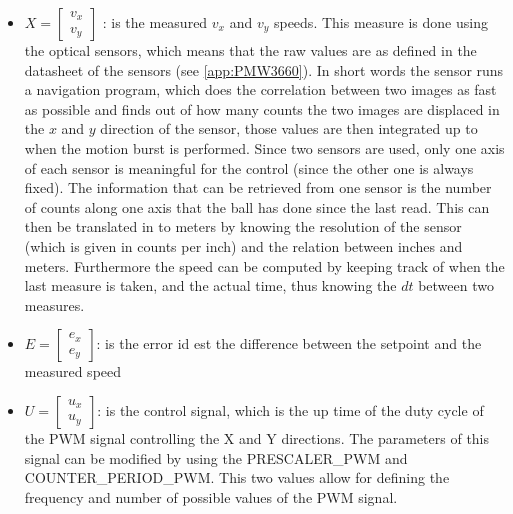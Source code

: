 \documentclass[12pt,a4paper]{article}
\begin{document}
\begin{itemize}
	\item 
	$X = \begin{bmatrix}
	v_x\\
	v_y
	\end{bmatrix}$
	: is the measured $v_x$ and $v_y$ speeds. This measure is done using the optical sensors, which means that the raw values are as defined in the datasheet of the sensors (see \ref{app:PMW3660}). In short words the sensor runs a navigation program, which does the correlation between two images as fast as possible and finds out of how many counts the two images are displaced in the $x$ and $y$ direction of the sensor, those values are then integrated up to when the motion burst is performed. Since two sensors are used, only one axis of each sensor is meaningful for the control (since the other one is always fixed). The information that can be retrieved from one sensor is the number of counts along one axis that the ball has done since the last read. This can then be translated in to meters by knowing the resolution of the sensor (which is given in counts per inch) and the relation between inches and meters. Furthermore the speed can be computed by keeping track of when the last measure is taken, and the actual time, thus knowing the $dt$ between two measures.
	\item	
	$E = \begin{bmatrix}
	e_x\\
	e_y
	\end{bmatrix}$: is the error id est the difference between the setpoint and the measured speed
	\item  
	$U = 
	\begin{bmatrix}
		u_x\\
		u_y
	\end{bmatrix}$: is the control signal, which is the up time of the duty cycle of the PWM signal controlling the X and Y directions. The parameters of this signal can be modified by using the PRESCALER\_PWM and COUNTER\_PERIOD\_PWM. This two values allow for defining the frequency and number of possible values of the PWM signal.
\end{itemize}
\end{document}
